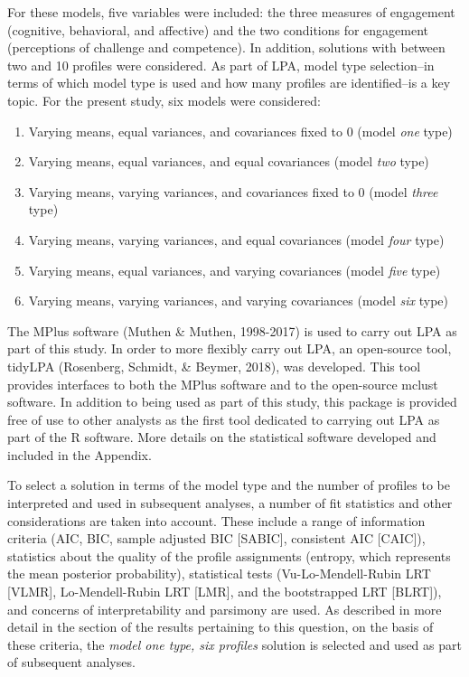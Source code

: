 \documentclass[]{book}
\providecommand{\tightlist}{%
  \setlength{\itemsep}{0pt}\setlength{\parskip}{0pt}}
\theoremstyle{definition}
\theoremstyle{definition}
\theoremstyle{definition}
\theoremstyle{remark}
\begin{document}
For these models, five variables were included: the three measures of
engagement (cognitive, behavioral, and affective) and the two conditions
for engagement (perceptions of challenge and competence). In addition,
solutions with between two and 10 profiles were considered. As part of
LPA, model type selection--in terms of which model type is used and how
many profiles are identified--is a key topic. For the present study, six
models were considered:

\begin{enumerate}
\def\labelenumi{\arabic{enumi}.}
\tightlist
\item
  Varying means, equal variances, and covariances fixed to 0 (model
  \emph{one} type)
\item
  Varying means, equal variances, and equal covariances (model
  \emph{two} type)
\item
  Varying means, varying variances, and covariances fixed to 0 (model
  \emph{three} type)
\item
  Varying means, varying variances, and equal covariances (model
  \emph{four} type)
\item
  Varying means, equal variances, and varying covariances (model
  \emph{five} type)
\item
  Varying means, varying variances, and varying covariances (model
  \emph{six} type)
\end{enumerate}

The MPlus software (Muthen \& Muthen, 1998-2017) is used to carry out
LPA as part of this study. In order to more flexibly carry out LPA, an
open-source tool, tidyLPA (Rosenberg, Schmidt, \& Beymer, 2018), was
developed. This tool provides interfaces to both the MPlus software and
to the open-source mclust software. In addition to being used as part of
this study, this package is provided free of use to other analysts as
the first tool dedicated to carrying out LPA as part of the R software.
More details on the statistical software developed and included in the
Appendix.

To select a solution in terms of the model type and the number of
profiles to be interpreted and used in subsequent analyses, a number of
fit statistics and other considerations are taken into account. These
include a range of information criteria (AIC, BIC, sample adjusted BIC
{[}SABIC{]}, consistent AIC {[}CAIC{]}), statistics about the quality of
the profile assignments (entropy, which represents the mean posterior
probability), statistical tests (Vu-Lo-Mendell-Rubin LRT {[}VLMR{]},
Lo-Mendell-Rubin LRT {[}LMR{]}, and the bootstrapped LRT {[}BLRT{]}),
and concerns of interpretability and parsimony are used. As described in
more detail in the section of the results pertaining to this question,
on the basis of these criteria, the \emph{model one type, six profiles}
solution is selected and used as part of subsequent analyses.
\end{document}
